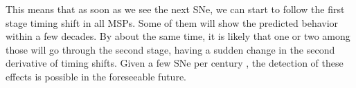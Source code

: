 \documentclass[aps,showpacs,onecolumn,floats,prd,superscriptaddress,nofootinbib]{revtex4}
\begin{document}
This means that as soon as we see the next SNe, we can start to follow the first stage timing shift in all MSPs. Some of them will show the predicted behavior within a few decades. By about the same time, it is likely that one or two among those will go through the second stage, having a sudden change in the second derivative of timing shifts. Given a few SNe per century \cite{SNrate06}, the detection of these effects is possible in the foreseeable future. 

\end{document}
